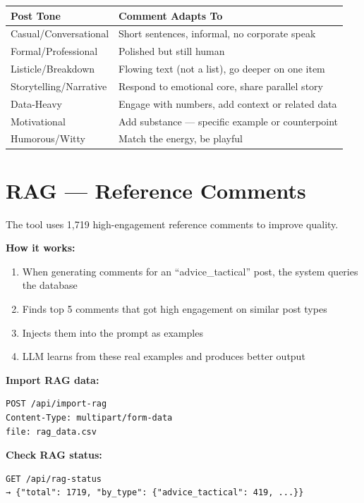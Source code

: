 \documentclass[12pt,a4paper]{article}
\begin{document}
\begin{center}
\begin{tabularx}{\textwidth}{lX}
\toprule
\textbf{Post Tone} & \textbf{Comment Adapts To} \\
\midrule
Casual/Conversational & Short sentences, informal, no corporate speak \\
Formal/Professional & Polished but still human \\
Listicle/Breakdown & Flowing text (not a list), go deeper on one item \\
Storytelling/Narrative & Respond to emotional core, share parallel story \\
Data-Heavy & Engage with numbers, add context or related data \\
Motivational & Add substance --- specific example or counterpoint \\
Humorous/Witty & Match the energy, be playful \\
\bottomrule
\end{tabularx}
\end{center}

\section{RAG --- Reference Comments}

The tool uses 1,719 high-engagement reference comments to improve quality.

\textbf{How it works:}
\begin{enumerate}[leftmargin=1.5em]
    \item When generating comments for an ``advice\_tactical'' post, the system queries the database
    \item Finds top 5 comments that got high engagement on similar post types
    \item Injects them into the prompt as examples
    \item LLM learns from these real examples and produces better output
\end{enumerate}

\textbf{Import RAG data:}
\begin{verbatim}
POST /api/import-rag
Content-Type: multipart/form-data
file: rag_data.csv
\end{verbatim}

\textbf{Check RAG status:}
\begin{verbatim}
GET /api/rag-status
→ {"total": 1719, "by_type": {"advice_tactical": 419, ...}}
\end{verbatim}
\end{document}
